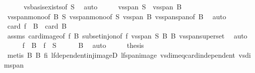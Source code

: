 \begin{isabellebody}
\ \ \ \ \isamarkupfalse%
\ vs{}{\isachardot}{\kern0pt}basis{\isacharunderscore}{\kern0pt}exists{\isacharbrackleft}{\kern0pt}of\ S{\isacharbrackright}{\kern0pt}\ \isamarkupfalse%
\ auto\isanewline
\ \ \isamarkupfalse%
\ \isamarkupfalse%
\ {\isachardoublequoteopen}vs{}{\isachardot}{\kern0pt}span\ S\ {\isacharequal}{\kern0pt}\ vs{}{\isachardot}{\kern0pt}span\ B{\isachardoublequoteclose}\isanewline
\ \ \ \ \isamarkupfalse%
\ vs{}{\isachardot}{\kern0pt}span{\isacharunderscore}{\kern0pt}mono{\isacharbrackleft}{\kern0pt}of\ B\ S{\isacharbrackright}{\kern0pt}\ vs{}{\isachardot}{\kern0pt}span{\isacharunderscore}{\kern0pt}mono{\isacharbrackleft}{\kern0pt}of\ S\ {\isachardoublequoteopen}vs{}{\isachardot}{\kern0pt}span\ B{\isachardoublequoteclose}{\isacharbrackright}{\kern0pt}\ vs{}{\isachardot}{\kern0pt}span{\isacharunderscore}{\kern0pt}span{\isacharbrackleft}{\kern0pt}of\ B{\isacharbrackright}{\kern0pt}\ \isamarkupfalse%
\ auto\isanewline
\ \ \isamarkupfalse%
\ \isamarkupfalse%
\ {\isachardoublequoteopen}card\ {\isacharparenleft}{\kern0pt}f\ {\isacharbackquote}{\kern0pt}\ B{\isacharparenright}{\kern0pt}\ {\isacharequal}{\kern0pt}\ card\ B{\isachardoublequoteclose}\isanewline
\ \ \ \ \isamarkupfalse%
\ assms\ card{\isacharunderscore}{\kern0pt}image{\isacharbrackleft}{\kern0pt}of\ f\ B{\isacharbrackright}{\kern0pt}\ subset{\isacharunderscore}{\kern0pt}inj{\isacharunderscore}{\kern0pt}on{\isacharbrackleft}{\kern0pt}of\ f\ {\isachardoublequoteopen}vs{}{\isachardot}{\kern0pt}span\ S{\isachardoublequoteclose}\ B{\isacharbrackright}{\kern0pt}\ B\ vs{}{\isachardot}{\kern0pt}span{\isacharunderscore}{\kern0pt}superset\ \isamarkupfalse%
\ auto\isanewline
\ \ \isamarkupfalse%
\ \isamarkupfalse%
\ {\isachardoublequoteopen}{\isacharparenleft}{\kern0pt}f\ {\isacharbackquote}{\kern0pt}\ B{\isacharparenright}{\kern0pt}\ {\isasymsubseteq}\ {\isacharparenleft}{\kern0pt}f\ {\isacharbackquote}{\kern0pt}\ S{\isacharparenright}{\kern0pt}{\isachardoublequoteclose}\isanewline
\ \ \ \ \isamarkupfalse%
\ B\ \isamarkupfalse%
\ auto\isanewline
\ \ \isamarkupfalse%
\ \isamarkupfalse%
\ {\isacharquery}{\kern0pt}thesis\isanewline
\ \ \ \ \isamarkupfalse%
\ {\isacharparenleft}{\kern0pt}metis\ B{\isacharparenleft}{\kern0pt}{}{\isacharparenright}{\kern0pt}\ B{\isacharparenleft}{\kern0pt}{}{\isacharparenright}{\kern0pt}\ fi\ lf{\isachardot}{\kern0pt}dependent{\isacharunderscore}{\kern0pt}inj{\isacharunderscore}{\kern0pt}imageD\ lf{\isachardot}{\kern0pt}span{\isacharunderscore}{\kern0pt}image\ vs{}{\isachardot}{\kern0pt}dim{\isacharunderscore}{\kern0pt}eq{\isacharunderscore}{\kern0pt}card{\isacharunderscore}{\kern0pt}independent\ vs{}{\isachardot}{\kern0pt}dim{\isacharunderscore}{\kern0pt}span{\isacharparenright}{\kern0pt}\isanewline

\end{isabellebody}
